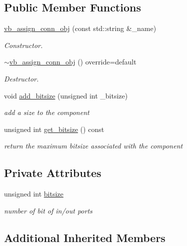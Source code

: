 \subsection*{Public Member Functions}
\begin{DoxyCompactItemize}
\item 
\hyperlink{classvb__assign__conn__obj_aba1a9d8092afaaaaeadcd04dd3a8a16a}{vb\+\_\+assign\+\_\+conn\+\_\+obj} (const std\+::string \&\+\_\+name)
\begin{DoxyCompactList}\small\item\em Constructor. \end{DoxyCompactList}\item 
\hyperlink{classvb__assign__conn__obj_ae07f248205d13dd22ba76694b766184a}{$\sim$vb\+\_\+assign\+\_\+conn\+\_\+obj} () override=default
\begin{DoxyCompactList}\small\item\em Destructor. \end{DoxyCompactList}\item 
void \hyperlink{classvb__assign__conn__obj_a9cc96e0d0b73a063cb691aa79ad46c9c}{add\+\_\+bitsize} (unsigned int \+\_\+bitsize)
\begin{DoxyCompactList}\small\item\em add a size to the component \end{DoxyCompactList}\item 
unsigned int \hyperlink{classvb__assign__conn__obj_af101b9819086ff6b3ce4979d3e28aa3e}{get\+\_\+bitsize} () const
\begin{DoxyCompactList}\small\item\em return the maximum bitsize associated with the component \end{DoxyCompactList}\end{DoxyCompactItemize}
\subsection*{Private Attributes}
\begin{DoxyCompactItemize}
\item 
unsigned int \hyperlink{classvb__assign__conn__obj_ac039d4bbfcee34d8277ab5afd2941f70}{bitsize}
\begin{DoxyCompactList}\small\item\em number of bit of in/out ports \end{DoxyCompactList}\end{DoxyCompactItemize}
\subsection*{Additional Inherited Members}


